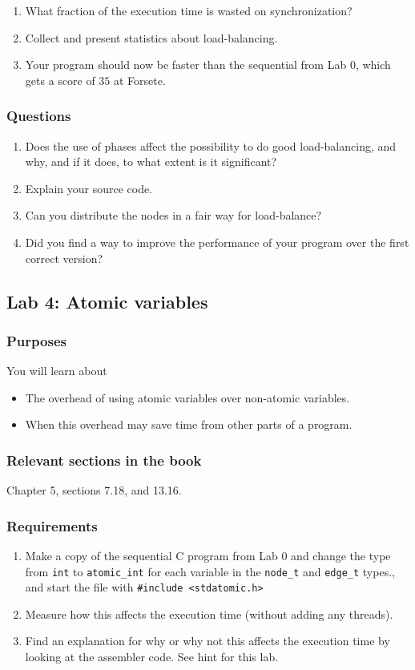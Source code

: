 \documentclass{forsete}
\begin{document}
{\begin{enumerate}
\item What fraction of the execution time is wasted on synchronization?

\item Collect and present statistics about load-balancing.
\item Your program should now be faster than the sequential from Lab 0, which gets a score of $35$ at
Forsete.

\end{enumerate}

\subsubsection*{Questions}
\begin{enumerate}
\item Does the use of phases affect the possibility to do good load-balancing, and why, and if it does, to 
what extent is it significant?
\item Explain your source code.
\item Can you distribute the nodes in a fair way for load-balance?
\item Did you find a way to improve the performance of your program over the first correct version?

\end{enumerate}

\newpage
\subsection*{Lab 4: Atomic variables}
\subsubsection*{Purposes}
You will learn about
\begin{itemize}
\item The overhead of using atomic variables over non-atomic variables.
\item When this overhead may save time from other parts of a program.
\end{itemize}

\subsubsection*{Relevant sections in the book}
Chapter 5, sections 7.18, and 13.16.
\subsubsection*{Requirements}
\begin{enumerate}
\item Make a copy of the sequential C program from Lab 0 and change the
type from \verb.int. to \verb.atomic_int. for each variable in the 
\verb.node_t. and \verb.edge_t. types., and start the file with \verb!#include <stdatomic.h>!
\item Measure how this affects the execution time (without adding any threads).
\item Find an explanation for why or why not this affects the execution time by looking at the 
assembler code. See hint for this lab. 


\end{enumerate}}
\end{document}

